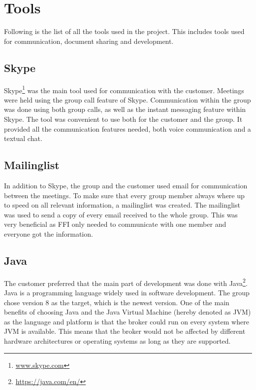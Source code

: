 \section{Tools}
\label{sec:prestudies-tools}

Following is the list of all the tools used in the project. This includes tools used for communication, document sharing and development.

\subsection{Skype}
\label{subsec:prestudies-tools-skype}

Skype\footnote{\url{www.skype.com}} was the main tool used for communication with the customer. Meetings were held using the group call feature of Skype. Communication within the group was done using both group calls, as well as the instant messaging feature within Skype. The tool was convenient to use both for the customer and the group. It provided all the communication features needed, both voice communication and a textual chat.

\subsection{Mailinglist}
\label{subsec:prestudies-tools-mailinglist}

In addition to Skype, the group and the customer used email for communication between the meetings. To make sure that every group member always where up to speed on all relevant information, a mailinglist was created. The mailinglist was used to send a copy of every email received to the whole group. This was very beneficial as FFI only needed to communicate with one member and everyone got the information.

\subsection{Java}
\label{subsec:prestudies-tools-java}

The customer preferred that the main part of development was done with Java\footnote{\url{https://java.com/en/}}. Java is a programming language widely used in software development. The group chose version 8 as the target, which is the newest version. One of the main benefits of choosing Java and the Java Virtual Machine (hereby denoted as JVM) as the language and platform is that the broker could run on every system where JVM is available. This means that the broker would not be affected by different hardware architectures or operating systems as long as they are supported.

